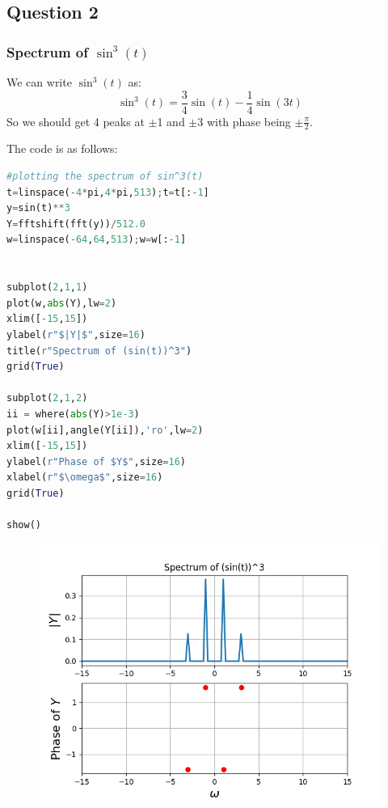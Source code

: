 \documentclass[11pt, a4paper]{article}
\begin{document}
\subsection{Question 2}
\subsubsection{Spectrum of $\sin^3(t)$}
We can write $\sin^3(t)$ as:
\begin{equation*}
    \sin^3(t) = \frac{3}{4}\sin(t) - \frac{1}{4}\sin(3t)
\end{equation*}
So we should get 4 peaks at $\pm$1 and $\pm$3 with phase being $\pm\frac{\pi}{2}$.

The code is as follows:
\begin{lstlisting}[language = Python]
#plotting the spectrum of sin^3(t)
t=linspace(-4*pi,4*pi,513);t=t[:-1]
y=sin(t)**3
Y=fftshift(fft(y))/512.0
w=linspace(-64,64,513);w=w[:-1]


subplot(2,1,1)
plot(w,abs(Y),lw=2)
xlim([-15,15])
ylabel(r"$|Y|$",size=16)
title(r"Spectrum of (sin(t))^3")
grid(True)

subplot(2,1,2)
ii = where(abs(Y)>1e-3)
plot(w[ii],angle(Y[ii]),'ro',lw=2)
xlim([-15,15])
ylabel(r"Phase of $Y$",size=16)
xlabel(r"$\omega$",size=16)
grid(True)

show()
\end{lstlisting}

\begin{figure}[H]
    \centering
    \includegraphics[scale = 0.8]{Figure_5.png}
\end{figure}
\end{document}
